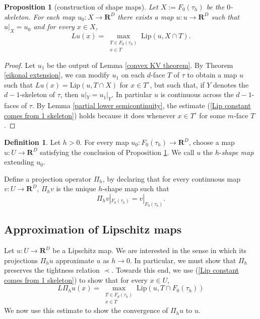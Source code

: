 \documentclass[reqno,11pt]{amsart}
\newcommand{\RR}{\mathbf{R}}
\newcommand{\Lip}{\mathrm{Lip}}
\newcommand{\dfn}[1]{\emph{#1}\index{#1}}
\newtheorem{proposition}[theorem]{Proposition}
\theoremstyle{definition}
\newtheorem{definition}[theorem]{Definition}
\numberwithin{equation}{section}
\begin{document}
\begin{proposition}[construction of shape maps]\label{construction of shape maps}
Let $X := F_0(\tau_h)$ be the $0$-skeleton.
For each map $u_0: X \to \RR^D$ there exists a map $u: u \to \RR^D$ such that $u|_X = u_0$ and for every $x \in X$,
\begin{equation}\label{Lip constant comes from 1 skeleton}
Lu(x) = \max_{\substack{T \in F_d(\tau_h) \\ x \in T}} \Lip(u, X \cap T).
\end{equation}
\end{proposition}
\begin{proof}
Let $u_1$ be the output of Lemma \ref{convex KV theorem}.
By Theorem \ref{eikonal extension}, we can modify $u_1$ on each $d$-face $T$ of $\tau$ to obtain a map $u$ such that $Lu(x) = \Lip(u, T \cap X)$ for $x \in T^\circ$, but such that, if $Y$ denotes the $d - 1$-skeleton of $\tau$, then $u|_Y = u_1|_Y$.
In partiular $u$ is continuous across the $d - 1$-faces of $\tau$.
By Lemma \ref{partial lower semicontinuity}, the estimate (\ref{Lip constant comes from 1 skeleton}) holds because it does whenever $x \in T^\circ$ for some $m$-face $T$.
\end{proof}

\begin{definition}\label{shape map}
Let $h > 0$.
For every map $u_0: F_0(\tau_h) \to \RR^D$, choose a map $u: U \to \RR^D$ satisfying the conclusion of Proposition \ref{construction of shape maps}.
We call $u$ the $h$-\dfn{shape map} extending $u_0$.

Define a projection operator $\Pi_h$, by declaring that for every continuous map $v: U \to \RR^D$, $\Pi_h v$ is the unique $h$-shape map such that 
$$\Pi_h v|_{F_0(\tau_h)} = v|_{F_0(\tau_h)}.$$
\end{definition}

\subsection{Approximation of Lipschitz maps}
Let $u: U \to \RR^D$ be a Lipschitz map.
We are interested in the sense in which its projections $\Pi_h u$ approximate $u$ as $h \to 0$.
In particular, we must show that $\Pi_h$ preserves the tightness relation $\prec$.
Towards this end, we use (\ref{Lip constant comes from 1 skeleton}) to show that for every $x \in U$,
\begin{equation}\label{discrete derivative is vertex lip}
L \Pi_h u(x) = \max_{\substack{T \in F_d(\tau_h) \\ x \in T}} \Lip(u, T \cap F_0(\tau_h))
\end{equation}
We now use this estimate to show the convergence of $\Pi_h u$ to $u$.
\end{document}
